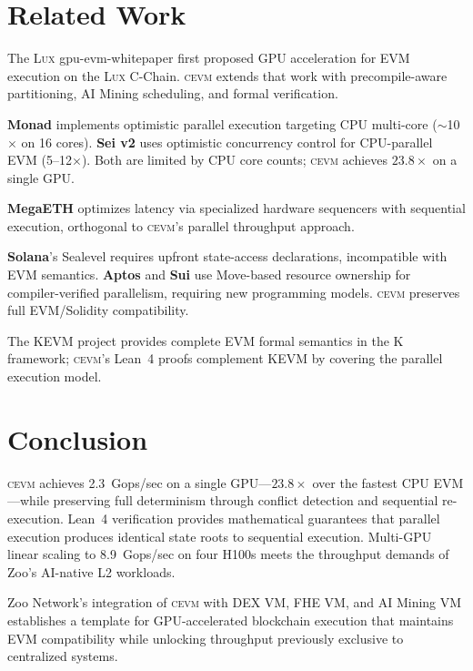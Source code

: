 \documentclass[11pt,letterpaper]{article}
\theoremstyle{definition}
\theoremstyle{remark}
\newcommand{\cevm}{\textsc{cevm}}
\newcommand{\Lux}{\textsc{Lux}}
\begin{document}
\section{Related Work}
\label{sec:related}

The \Lux{} gpu-evm-whitepaper \cite{lux-gpu-evm} first proposed GPU acceleration for EVM execution on the \Lux{} C-Chain.
\cevm{} extends that work with precompile-aware partitioning, AI Mining scheduling, and formal verification.

\textbf{Monad} \cite{monad2024} implements optimistic parallel execution targeting CPU multi-core ($\sim$10$\times$ on 16 cores).
\textbf{Sei v2} \cite{sei2024} uses optimistic concurrency control for CPU-parallel EVM (5--12$\times$).
Both are limited by CPU core counts; \cevm{} achieves $23.8\times$ on a single GPU.

\textbf{MegaETH} \cite{megaeth2024} optimizes latency via specialized hardware sequencers with sequential execution, orthogonal to \cevm{}'s parallel throughput approach.

\textbf{Solana}'s Sealevel \cite{solana2020} requires upfront state-access declarations, incompatible with EVM semantics.
\textbf{Aptos} and \textbf{Sui} use Move-based resource ownership for compiler-verified parallelism, requiring new programming models.
\cevm{} preserves full EVM/Solidity compatibility.

The KEVM project \cite{kevm2018} provides complete EVM formal semantics in the K framework; \cevm{}'s Lean~4 proofs complement KEVM by covering the parallel execution model.

\section{Conclusion}
\label{sec:conclusion}

\cevm{} achieves 2.3~Gops/sec on a single GPU---$23.8\times$ over the fastest CPU EVM---while preserving full determinism through conflict detection and sequential re-execution.
Lean~4 verification provides mathematical guarantees that parallel execution produces identical state roots to sequential execution.
Multi-GPU linear scaling to 8.9~Gops/sec on four H100s meets the throughput demands of Zoo's AI-native L2 workloads.

Zoo Network's integration of \cevm{} with DEX VM, FHE VM, and AI Mining VM establishes a template for GPU-accelerated blockchain execution that maintains EVM compatibility while unlocking throughput previously exclusive to centralized systems.
\end{document}
